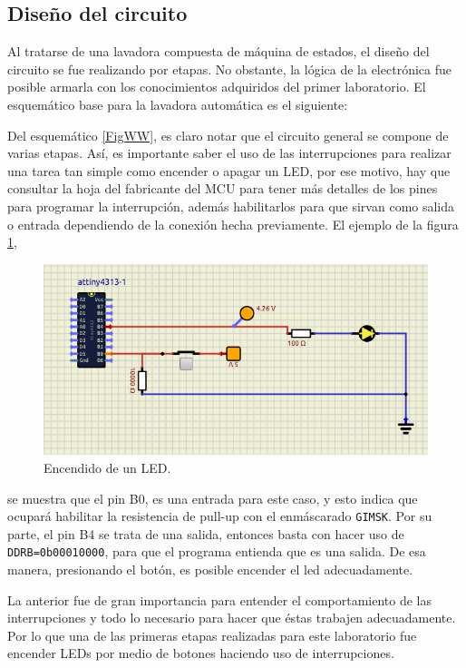 \subsection*{Diseño del circuito}

Al tratarse de una lavadora compuesta de máquina de estados, el diseño del circuito se fue realizando por etapas. No obstante, la lógica de la electrónica fue posible armarla con los conocimientos adquiridos del primer laboratorio. El esquemático base para la lavadora automática es el siguiente:
 
Del esquemático \ref{FigWW}, es claro notar que el circuito general se compone de varias etapas. Así, es importante saber el uso de las interrupciones para realizar una tarea tan simple como encender o apagar un LED, por ese motivo, hay que consultar la hoja del fabricante del MCU para tener más detalles de los pines para programar la interrupción, además habilitarlos para que sirvan como salida o entrada dependiendo de la conexión hecha previamente. El ejemplo de la figura \ref{fig11},
    \begin{figure}[H]
        \centering
        \includegraphics[width=.7\linewidth]{Imagenes/5.1.png}
        \caption{Encendido de un LED.}
        \label{fig11}
    \end{figure}
se muestra que el pin B0, es una entrada para este caso, y esto indica que ocupará habilitar la resistencia de pull-up con el enmáscarado \texttt{GIMSK}. Por su parte, el pin B4 se trata de una salida, entonces basta con hacer uso de \texttt{DDRB=0b00010000}, para que el programa entienda que es una salida. De esa manera, presionando el botón, es posible encender el led adecuadamente.\par
La anterior fue de gran importancia para entender el comportamiento de las interrupciones y todo lo necesario para hacer que éstas trabajen adecuadamente. Por lo que una de las primeras etapas realizadas para este laboratorio fue encender LEDs por medio de botones haciendo uso de interrupciones.
